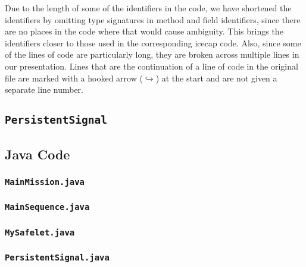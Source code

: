 Due to the length of some of the identifiers in the code, we have
shortened the identifiers by omitting type signatures in method
and field identifiers, since there are no places in the code where
that would cause ambiguity.
This brings the identifiers closer to those used in the corresponding
icecap code.
Also, since some of the lines of code are particularly long, 
they are broken across multiple lines in our presentation.
Lines that are the continuation of a line of code in the original file
are marked with a hooked arrow (\mbox{$\hookrightarrow$}) at the start
and are not given a separate line number.

\begin{landscape}
\begin{multicols}{2}

\section{\texorpdfstring{\texttt{PersistentSignal}}{PersistentSignal}}
\label{PersistentSignal-code-section}

\subsection{Java Code}
\label{PersistentSignal-java-code-subsection}

\subsubsection{\texttt{MainMission.java}}


\subsubsection{\texttt{MainSequence.java}}


\subsubsection{\texttt{MySafelet.java}}


\subsubsection{\texttt{PersistentSignal.java}}



\end{multicols}
\end{landscape}
